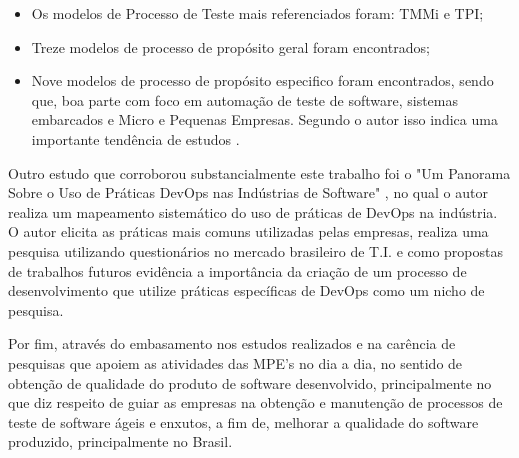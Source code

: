 \begin{itemize}
    \item Os modelos de Processo de Teste mais referenciados foram: TMMi e TPI;
    \item Treze modelos de processo de propósito geral foram encontrados;
    \item Nove modelos de processo de propósito especifico foram encontrados, sendo que, boa parte com foco em automação de teste de software, sistemas embarcados e Micro e Pequenas Empresas. Segundo o autor isso indica uma importante tendência de estudos \cite{Carlo2010}.
\end{itemize}

Outro estudo que corroborou substancialmente este trabalho foi o "Um Panorama Sobre o Uso de Práticas DevOps nas Indústrias de Software" \cite{BRAGA2015}, no qual o autor realiza um mapeamento sistemático do uso de práticas de DevOps na indústria. O autor elicita as práticas mais comuns utilizadas pelas empresas, realiza uma pesquisa utilizando questionários no mercado brasileiro de T.I. e como propostas de trabalhos futuros evidência a importância da criação de um processo de desenvolvimento que utilize práticas específicas de DevOps como um nicho de pesquisa.

Por fim, através do embasamento nos estudos realizados e na carência de pesquisas que apoiem as atividades das MPE's no dia a dia, no sentido de obtenção de qualidade do produto de software desenvolvido, principalmente no que diz respeito de guiar as empresas na obtenção e manutenção de processos de teste de software ágeis e enxutos, a fim de, melhorar a qualidade do software produzido, principalmente no Brasil.